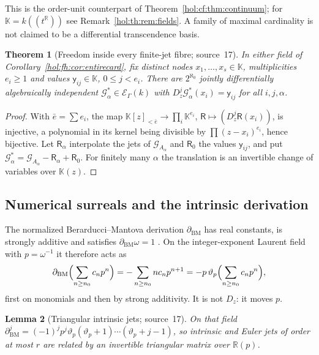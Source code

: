 \documentclass[11pt]{article}
\numberwithin{equation}{section}
\newtheorem{theorem}{Theorem}[section]
\newtheorem{lemma}[theorem]{Lemma}
\theoremstyle{definition}
\theoremstyle{remark}
\newcommand{\R}{\mathbb R}
\newcommand{\KK}{\mathbb K}
\newcommand{\EK}{\mathcal E_\Gamma(k)}
\begin{document}
This is the order-unit counterpart of Theorem~\ref{hol:cf:thm:continuum}; for
$\KK=k((t^\R))$ see Remark~\ref{hol:th:rem:fields}. A family of maximal
cardinality is not claimed to be a differential transcendence basis.

\begin{theorem}[Freedom inside every finite-jet fibre; source~17]
\label{hol:fh:thm:hermite}
In either field of Corollary~\ref{hol:fh:cor:entirecard}, fix distinct nodes
$x_1,\ldots,x_s\in\KK$, multiplicities $e_i\ge1$ and values
$\mathsf y_{ij}\in\KK$, $0\le j<e_i$. There are $2^{\aleph_0}$ jointly
differentially algebraically independent $\mathcal G^*_\alpha\in\EK$ with
$D_z^j\mathcal G^*_\alpha(x_i)=\mathsf y_{ij}$ for all $i,j,\alpha$.
\end{theorem}

\begin{proof}
With $\bar e=\sum e_i$, the map $\KK[z]_{<\bar e}\to\prod_i\KK^{e_i}$,
$\mathsf R\mapsto(D_z^j\mathsf R(x_i))$, is injective, a polynomial in its kernel
being divisible by $\prod(z-x_i)^{e_i}$, hence bijective. Let $\mathsf
R_\alpha$ interpolate the jets of $\mathcal G_{A_\alpha}$ and $\mathsf R_0$ the
values $\mathsf y_{ij}$, and put $\mathcal G^*_\alpha=\mathcal G_{A_\alpha}-
\mathsf R_\alpha+\mathsf R_0$. For finitely many $\alpha$ the translation is an
invertible change of variables over $\KK(z)$.
\end{proof}

\subsection{Numerical surreals and the intrinsic derivation}
\label{hol:fh:sub:actual}

The normalized Berarducci--Mantova derivation $\partial_{\mathrm{BM}}$ has real
constants, is strongly additive and satisfies $\partial_{\mathrm{BM}}\omega=1$
\cite{bm}. On the integer-exponent Laurent field with $p=\omega^{-1}$ it
therefore acts as
\begin{equation}\label{hol:fh:eq:bm}
 \partial_{\mathrm{BM}}\Bigl(\sum_{n\ge n_0}c_np^n\Bigr)=-\sum_{n\ge n_0}nc_np^{n+1}
 =-p\,\vartheta_p\Bigl(\sum_{n\ge n_0}c_np^n\Bigr),
\end{equation}
first on monomials and then by strong additivity. It is not $D_z$: it moves
$p$.

\begin{lemma}[Triangular intrinsic jets; source~17]\label{hol:fh:lem:bmtriangular}
On that field $\partial_{\mathrm{BM}}^j=(-1)^jp^j\vartheta_p(\vartheta_p+1)\cdots
(\vartheta_p+j-1)$, so intrinsic and Euler jets of order at most $r$ are related
by an invertible triangular matrix over $\R(p)$.
\end{lemma}
\end{document}
